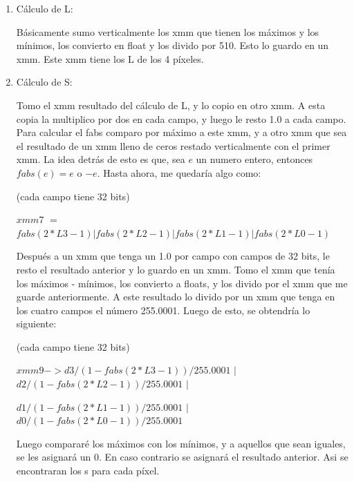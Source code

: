 \documentclass[a4paper]{article}
\begin{document}
\begin{enumerate}
	\item Cálculo de L:
	
	Básicamente sumo verticalmente los xmm que tienen los máximos y los mínimos, los convierto en float y los divido por 510. Esto lo guardo en un xmm. Este xmm tiene los L de los 4 píxeles.
	
	\item Cálculo de S:	
	
Tomo el xmm resultado del cálculo de L, y lo copio en otro xmm. A esta copia la multiplico por dos en cada campo, y luego le resto 1.0 a cada campo. Para calcular el fabs comparo por máximo a este xmm, y a otro xmm que sea el resultado de un xmm lleno de ceros restado verticalmente con el primer xmm. La idea detrás de esto es que, sea $e$ un numero entero, entonces $fabs(e) = e$ o $-e$. Hasta ahora, me quedaría algo como:

\vspace*{0.3cm}

(cada campo tiene 32 bits)

\vspace*{0.3cm}
	
$xmm7$ $=$ $fabs(2*L3 - 1) |fabs(2*L2 - 1)|fabs(2*L1 - 1)| fabs( 2*L0 - 1)$	
	
\vspace*{0.3cm}

Después a un xmm que tenga un 1.0 por campo con campos de 32 bits, le resto el resultado anterior y lo guardo en un xmm. Tomo el xmm que tenía los máximos - mínimos, los convierto a floats, y los divido por el xmm que me guarde anteriormente. A este resultado lo divido por un xmm que tenga en los cuatro campos el número 255.0001. Luego de esto, se obtendría lo siguiente:  

\vspace*{0.3cm}

(cada campo tiene 32 bits)

\vspace*{0.3cm}

$xmm9 -> d3 / (1 - fabs(2*L3 - 1)) / 255.0001$ $|$ $d2 / (1 - fabs(2*L2 - 1)) / 255.0001$ $|$

\hspace*{1.75cm}$d1 / (1 - fabs(2*L1 - 1)) / 255.0001$ $|$ $ d0/ (1 - fabs( 2*L0 - 1)) / 255.0001$

\vspace*{0.3cm}
	
Luego compararé los máximos con los mínimos, y a aquellos que sean iguales, se les asignará un 0. En caso contrario se asignará el resultado anterior. Asi se encontraran los s para cada píxel.


\end{enumerate}
\end{document}
